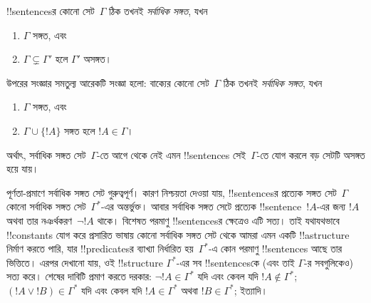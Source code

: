 \documentclass[../../../include/open-logic-section]{subfiles}
\begin{document}

\begin{defn}[সর্বাধিক সঙ্গত সেট]
!!{sentence}sর কোনো সেট~$\Gamma$ ঠিক তখনই \emph{সর্বাধিক সঙ্গত}, যখন
\begin{enumerate}
\item $\Gamma$ সঙ্গত, এবং
\item $\Gamma \subsetneq \Gamma'$ হলে $\Gamma'$ অসঙ্গত।
\end{enumerate}
\end{defn}

\begin{explain}
উপরের সংজ্ঞার সমতুল্য আরেকটি সংজ্ঞা হলো: বাক্যের কোনো সেট~$\Gamma$
ঠিক তখনই \emph{সর্বাধিক সঙ্গত}, যখন
\begin{enumerate}
\item $\Gamma$ সঙ্গত, এবং
\item $\Gamma \cup \{ !A \}$ সঙ্গত হলে $!A \in \Gamma$।
\end{enumerate}
অর্থাৎ, সর্বাধিক সঙ্গত সেট~$\Gamma$-তে আগে থেকে নেই এমন
!!{sentence}s সেই~$\Gamma$-তে যোগ করলে বড় সেটটি অসঙ্গত হয়ে যায়।
\end{explain}

\begin{explain}
পূর্ণতা-প্রমাণে সর্বাধিক সঙ্গত সেট গুরুত্বপূর্ণ। কারণ নিশ্চয়তা দেওয়া যায়,
!!{sentence}sর প্রত্যেক সঙ্গত সেট~$\Gamma$ কোনো সর্বাধিক সঙ্গত
সেট~$\Gamma^*$-এর অন্তর্ভুক্ত। আবার সর্বাধিক সঙ্গত সেটে প্রত্যেক
!!{sentence}~$!A$-এর জন্য $!A$ অথবা তার নঞর্থকরণ~$\lnot !A$ থাকে।
বিশেষত পরমাণু !!{sentence}sর ক্ষেত্রেও এটি সত্য। তাই যথাযথভাবে
!!{constant}s যোগ করে প্রসারিত ভাষায় কোনো সর্বাধিক সঙ্গত সেট থেকে
আমরা এমন একটি !!a{structure} নির্মাণ করতে পারি, যার
!!{predicate}sর ব্যাখ্যা নির্ধারিত হয়~$\Gamma^*$-এ কোন পরমাণু
!!{sentence}s আছে তার ভিত্তিতে। এরপর দেখানো যায়, ওই !!{structure}
$\Gamma^*$-এর সব !!{sentence}sকে (এবং তাই $\Gamma$-র সবগুলিকেও)
সত্য করে। শেষের দাবিটি প্রমাণ করতে দরকার: $\lnot !A \in
\Gamma^*$ যদি এবং কেবল যদি $!A \notin \Gamma^*$; $(!A \lor !B) \in
\Gamma^*$ যদি এবং কেবল যদি $!A \in \Gamma^*$ অথবা $!B \in
\Gamma^*$; ইত্যাদি।
\end{explain}
\end{document}
